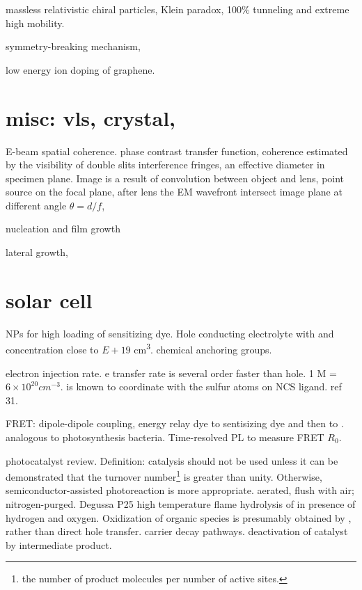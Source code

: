 massless relativistic chiral particles, Klein paradox, 100\% tunneling and extreme high mobility.

symmetry-breaking mechanism,

low energy ion doping of graphene.\cite{Ahlgren2011}

\section{misc: vls, crystal,}

E-beam spatial coherence.\cite{Morishita2013} phase contrast transfer function, coherence estimated by the visibility of double slits interference fringes, an effective diameter in specimen plane.  Image is a result of convolution between object and lens, point source on the focal plane, after lens the EM wavefront intersect image plane at different angle $\theta = d/f$, 

nucleation and film growth \cite{Hanbucken1984}

lateral growth, \cite{Zhang2014c}

\section{solar cell}


 NPs for high loading of sensitizing dye. Hole conducting electrolyte with  and  concentration close to $E+19$ \si{cm^3}. chemical anchoring groups.

electron injection rate. e transfer rate is several order faster than hole. 1 M = $6\times10^{20} cm^{-3}$.  is known to coordinate with the sulfur atoms on NCS ligand. ref 31.

FRET: dipole-dipole coupling, energy relay dye to sentisizing dye and then to . analogous to photosynthesis bacteria. Time-resolved PL to measure FRET $R_0$.

photocatalyst review.\cite{Mills1997} Definition: catalysis should not be used unless it can be demonstrated that the turnover number\footnote{the number of product molecules per number of active sites.} is greater than unity. Otherwise, semiconductor-assisted photoreaction is more appropriate. aerated, flush with air; nitrogen-purged. Degussa P25  high temperature flame hydrolysis of  in presence of hydrogen and oxygen. Oxidization of organic species is presumably obtained by , rather than direct hole transfer. carrier decay pathways. deactivation of catalyst by intermediate product.

